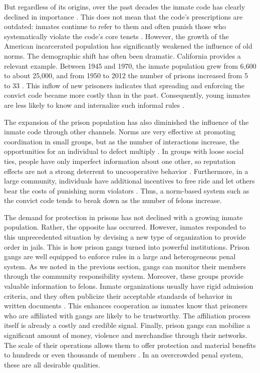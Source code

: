 \documentclass[a4paper, 12pt]{article}
\begin{document}
But regardless of its origins, over the past decades the inmate code has clearly declined in importance \citep{irwin1970felon,jacobs1975stratification,skarbek2014social}. This does not mean that the code's prescriptions are outdated: inmates continue to refer to them and often punish those who systematically violate the code's core tenets  \citep{copes2013accounting,trammell2012enforcing}. However, the growth of the American incarcerated population has significantly weakened the influence of old norms. The demographic shift has often been dramatic. California provides a relevant example. Between 1945 and 1970, the inmate population grew from 6,600 to about 25,000, and from 1950 to 2012 the number of prisons increased from 5 to 33 \citep{bass1975analysis,skarbek2014social}. This inflow of new prisoners indicates that spreading and enforcing the convict code became more costly than in the past. Consequently, young inmates are less likely to know and internalize such informal rules \citep{hunt1993change}. 

The expansion of the prison population has also diminished the influence of the inmate code through other channels. Norms are very effective at promoting coordination in small groups, but as the number of interactions increase, the opportunities for an individual to defect multiply \citep{bowles1998moral,cook2009whom}. In groups with loose social ties, people have only imperfect information about one other, so reputation effects are not a strong deterrent to uncooperative behavior \citep{shapiro1983premiums}. Furthermore, in a large community, individuals have additional incentives to free ride and let others bear the costs of punishing norm violators \citep{groves1977optimal,olson1965logic,samuelson1954pure}. Thus, a norm-based system such as the convict code tends to break down as the number of felons increase. 

The demand for protection in prisons has not declined with a growing inmate population. Rather, the opposite has occurred. However, inmates responded to this unprecedented situation by devising a new type of organization to provide order in jails. This is how prison gangs turned into powerful institutions. Prison gangs are well equipped to enforce rules in a large and heterogeneous penal system. As we noted in the previous section, gangs can monitor their members through the community responsibility system. Moreover, these groups provide valuable information to felons. Inmate organizations usually have rigid admission criteria, and they often publicize their acceptable standards of behavior in written documents  \citep{skarbek2010putting,skarbek2012prison}. This enhances cooperation as inmates know that prisoners who are affiliated with gangs are likely to be trustworthy. The affiliation process itself is already a costly and credible signal. Finally, prison gangs can mobilize a significant amount of money, violence and merchandise through their networks. The scale of their operations allows them to offer protection and material benefits to hundreds or even thousands of members \citep{blatchford2008black,camp1985prison,lessing2014build}. In an overcrowded penal system, these are all desirable qualities.
\end{document}
